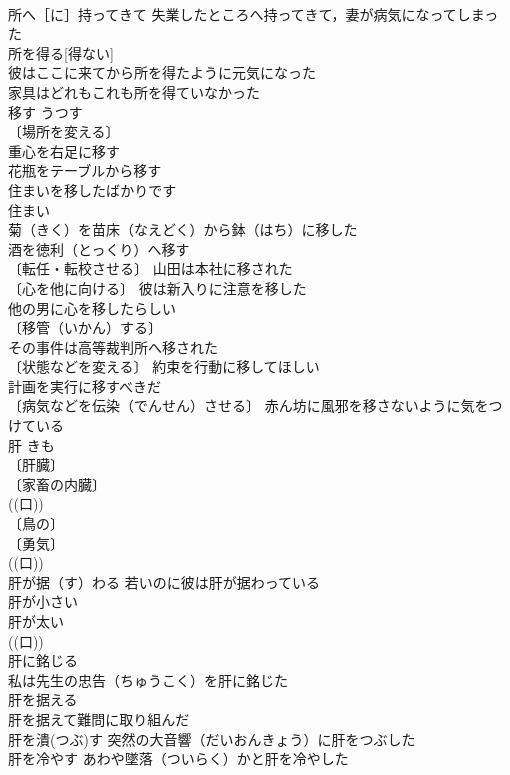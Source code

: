 \documentclass[8pt]{extreport}
\begin{document}
\begin{CJK}{UTF8}{min}
\\	所へ［に］持ってきて 失業したところへ持ってきて，妻が病気になってしまった 
\\	所を得る[得ない]　
\\	彼はここに来てから所を得たように元気になった 
\\	家具はどれもこれも所を得ていなかった 
\\	移す	うつす	
\\	〔場所を変える〕
\\	重心を右足に移す 
\\	花瓶をテーブルから移す 
\\	住まいを移したばかりです 
\\	住まい　
\\	菊（きく）を苗床（なえどく）から鉢（はち）に移した 
\\	酒を徳利（とっくり）へ移す 
\\	〔転任・転校させる〕 山田は本社に移された 
\\	〔心を他に向ける〕 彼は新入りに注意を移した 
\\	他の男に心を移したらしい 
\\	〔移管（いかん）する〕　
\\	その事件は高等裁判所へ移された 
\\	〔状態などを変える〕 約束を行動に移してほしい 
\\	計画を実行に移すべきだ 
\\	〔病気などを伝染（でんせん）させる〕 赤ん坊に風邪を移さないように気をつけている 
\\	肝	きも	
\\	〔肝臓〕
\\	〔家畜の内臓〕
\\	((口)) 
\\	〔鳥の〕
\\	〔勇気〕
\\	((口)) 
\\	肝が据（す）わる 若いのに彼は肝が据わっている 
\\	肝が小さい 
\\	肝が太い 
\\	((口)) 
\\	肝に銘じる　
\\	私は先生の忠告（ちゅうこく）を肝に銘じた 
\\	肝を据える　
\\	肝を据えて難問に取り組んだ 
\\	肝を潰(つぶ)す 突然の大音響（だいおんきょう）に肝をつぶした 
\\	肝を冷やす あわや墜落（ついらく）かと肝を冷やした 

\end{CJK}
\end{document}
